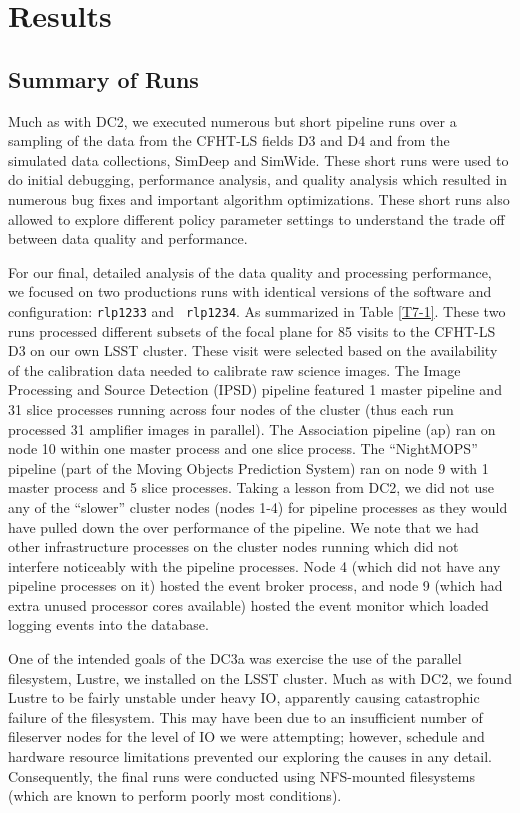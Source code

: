 
\section{Results}

\subsection{Summary of Runs}

Much as with DC2, we executed numerous but short pipeline runs over
a sampling of the data from the CFHT-LS fields D3 and D4 and from the
simulated data collections, SimDeep and SimWide.  These short runs
were used to do initial debugging, performance analysis, and quality
analysis which resulted in numerous bug fixes and important algorithm
optimizations.  These short runs also allowed to explore different
policy parameter settings to understand the trade off between data
quality and performance.  

For our final, detailed analysis of the data quality and processing
performance, we focused on two productions runs with identical
versions of the software and configuration: {\tt rlp1233} and {\tt
rlp1234}.  As summarized in Table \ref{T7-1}.  These two runs
processed different subsets of the focal plane for 85 visits to the
CFHT-LS D3 on our own LSST cluster.  These visit were selected based
on the availability of the calibration data needed to calibrate raw
science images.  The Image Processing and Source Detection (IPSD)
pipeline featured 1 master pipeline and 31 slice processes running
across four nodes of the cluster (thus each run processed 31 amplifier
images in parallel).  The Association pipeline (ap) ran on node 10
within one master process and one slice process.  The ``NightMOPS''
pipeline (part of the Moving Objects Prediction System) ran on node 9
with 1 master process and 5 slice processes.  Taking a lesson from
DC2, we did not use any of the ``slower'' cluster nodes (nodes 1-4)
for pipeline processes as they would have pulled down the over
performance of the pipeline.  We note that we had other infrastructure
processes on the cluster nodes running which did not interfere
noticeably with the pipeline processes.  Node 4 (which did not have
any pipeline processes on it) hosted the event broker process, and
node 9 (which had extra unused processor cores available) hosted the
event monitor which loaded logging events into the database.

One of the intended goals of the DC3a was exercise the use of the
parallel filesystem, Lustre, we installed on the LSST cluster.  Much
as with DC2, we found Lustre to be fairly unstable under heavy IO,
apparently causing catastrophic failure of the filesystem.  This may
have been due to an insufficient number of fileserver nodes for the
level of IO we were attempting; however, schedule and hardware
resource limitations prevented our exploring the causes in any
detail.  Consequently, the final runs were conducted using NFS-mounted
filesystems (which are known to perform poorly most conditions).  

